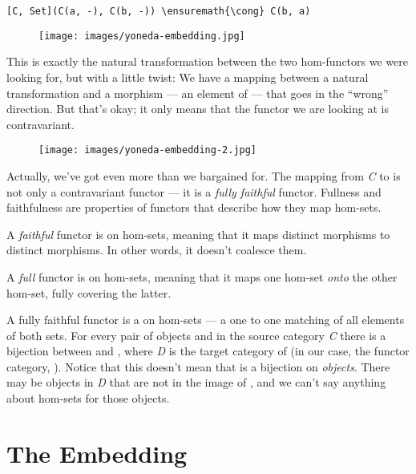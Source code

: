 \begin{Verbatim}[commandchars=\\\{\}]
[C, Set](C(a, -), C(b, -)) \ensuremath{\cong} C(b, a)
\end{Verbatim}

\begin{figure}[H]
\centering
\texttt{[image: images/yoneda-embedding.jpg]}
\end{figure}

\noindent
This is exactly the natural transformation between the two hom-functors
we were looking for, but with a little twist: We have a mapping between
a natural transformation and a morphism --- an element of
 --- that goes in the ``wrong'' direction. But that's
okay; it only means that the functor we are looking at is contravariant.

\begin{figure}[H]
\centering
\texttt{[image: images/yoneda-embedding-2.jpg]}
\end{figure}

\noindent
Actually, we've got even more than we bargained for. The mapping from
\emph{C} to \code{{[}C, Set{]}} is not only a contravariant functor
--- it is a \emph{fully faithful} functor. Fullness and faithfulness are
properties of functors that describe how they map hom-sets.

A \emph{faithful} functor is  on hom-sets, meaning that
it maps distinct morphisms to distinct morphisms. In other words, it
doesn't coalesce them.

A \emph{full} functor is  on hom-sets, meaning that it
maps one hom-set \emph{onto} the other hom-set, fully covering the
latter.

A fully faithful functor  is a  on hom-sets
--- a one to one matching of all elements of both sets. For every pair
of objects  and  in the source category \emph{C}
there is a bijection between  and
, where \emph{D} is the target category of
 (in our case, the functor category, \code{{[}C, Set{]}}).
Notice that this doesn't mean that  is a bijection on
\emph{objects}. There may be objects in \emph{D} that are not in the
image of , and we can't say anything about hom-sets for those
objects.

\section{The Embedding}\label{the-embedding}

